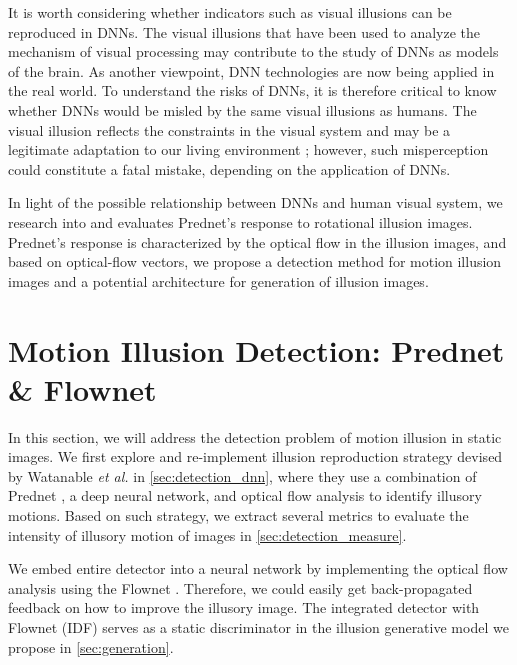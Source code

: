 \documentclass[journal]{IEEEtran}
\begin{document}
  It is worth considering whether indicators such as visual illusions can be reproduced in DNNs. The visual illusions that have been used to analyze the mechanism of visual processing may contribute to the study of DNNs as models of the brain. As another viewpoint, DNN technologies are now being applied in the real world. To understand the risks of DNNs, it is therefore critical to know whether DNNs would be misled by the same visual illusions as humans. The visual illusion reflects the constraints in the visual system and may be a legitimate adaptation to our living environment \cite{eagleman2001visual}; however, such misperception could constitute a fatal mistake, depending on the application of DNNs.
  
  In light of the possible relationship between DNNs and human visual system, we research into and evaluates Prednet's response to rotational illusion images. Prednet's response is characterized by the optical flow in the illusion images, and based on optical-flow vectors, we propose a detection method for motion illusion images and a potential architecture for generation of illusion images.
  
  \section{Motion Illusion Detection: Prednet \& Flownet}
  \label{sec:detection}
  In this section, we will address the detection problem of motion illusion in static images.
  We first explore and re-implement illusion reproduction strategy devised by Watanable \textit{et al.} \cite{watanable2018illusory} in \cref{sec:detection_dnn}, where they use a combination of Prednet \cite{lotter2016deep}, a deep neural network, and optical flow analysis to identify illusory motions.
  Based on such strategy, we extract several metrics to evaluate the intensity of illusory motion of images in \cref{sec:detection_measure}.
  
  We embed entire detector into a neural network by implementing the optical flow analysis using the Flownet \cite{ilg2017flownet}.
  Therefore, we could easily get back-propagated feedback on how to improve the illusory image.
  The integrated detector with Flownet (IDF) serves as a static discriminator in the illusion generative model we propose in \cref{sec:generation}.
  
\end{document}
